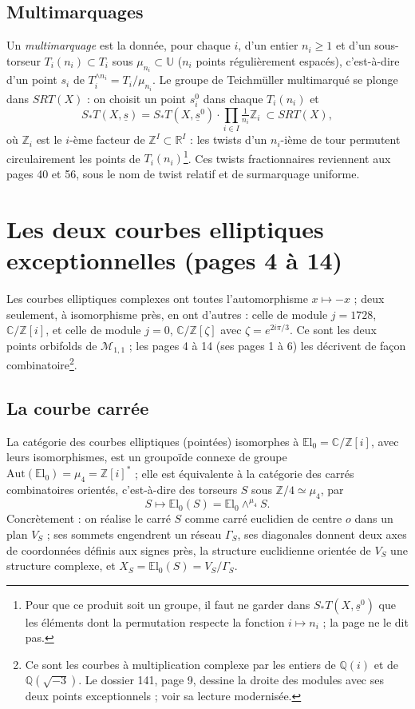 \documentclass[11pt,a4paper]{article}
\begin{document}
\subsection*{Multimarquages}

Un \emph{multimarquage} est la donnée, pour chaque $i$, d'un entier $n_i \geq 1$
et d'un sous-torseur $T_i(n_i) \subset T_i$ sous $\mu_{n_i} \subset \mathbb{U}$
($n_i$ points régulièrement espacés), c'est-à-dire d'un point $s_i$ de
$T_i^{\wedge n_i} = T_i/\mu_{n_i}$. Le groupe de Teichmüller multimarqué se
plonge dans $SRT(X)$ : on choisit un point $s^0_i$ dans chaque $T_i(n_i)$ et
\[
S_{*}T(X, \underline{s}) = S_{*}T(X, \underline{s}^{0}) \cdot \prod_{i \in I}
\tfrac{1}{n_i}\mathbb{Z}_i \ \subset SRT(X),
\]
où $\mathbb{Z}_i$ est le $i$-ème facteur de $\mathbb{Z}^{I} \subset
\mathbb{R}^{I}$ : les twists d'un $n_i$-ième de tour permutent circulairement
les points de $T_i(n_i)$\footnote{Pour que ce produit soit un groupe, il faut ne
garder dans $S_{*}T(X, \underline{s}^{0})$ que les éléments dont la permutation
respecte la fonction $i \mapsto n_i$ ; la page ne le dit pas.}. Ces
twists fractionnaires reviennent aux pages 40 et 56, sous le nom de twist
relatif et de surmarquage uniforme.

\section*{Les deux courbes elliptiques exceptionnelles (pages 4 à 14)}

Les courbes elliptiques complexes ont toutes l'automorphisme $x \mapsto -x$ ;
deux seulement, à isomorphisme près, en ont d'autres : celle de module $j =
1728$, $\mathbb{C}/\mathbb{Z}[i]$, et celle de module $j = 0$,
$\mathbb{C}/\mathbb{Z}[\zeta]$ avec $\zeta = e^{2i\pi/3}$. Ce sont les deux
points orbifolds de $\mathcal{M}_{1,1}$ ; les pages 4 à 14 (ses pages 1 à 6) les
décrivent de façon combinatoire\footnote{Ce sont les courbes à multiplication
complexe par les entiers de $\mathbb{Q}(i)$ et de $\mathbb{Q}(\sqrt{-3})$. Le
dossier 141, page 9, dessine la droite des modules avec ses deux points
exceptionnels ; voir sa lecture modernisée.}.

\subsection*{La courbe carrée}

La catégorie des courbes elliptiques (pointées) isomorphes à
$\mathbb{E}\mathrm{l}_0 = \mathbb{C}/\mathbb{Z}[i]$, avec leurs isomorphismes,
est un groupoïde connexe de groupe $\mathrm{Aut}(\mathbb{E}\mathrm{l}_0) = \mu_4
= \mathbb{Z}[i]^{*}$ ; elle est équivalente à la catégorie des carrés
combinatoires orientés, c'est-à-dire des torseurs $S$ sous $\mathbb{Z}/4 \simeq
\mu_4$, par
\[
S \longmapsto \mathbb{E}\mathrm{l}_0(S) = \mathbb{E}\mathrm{l}_0 \wedge^{\mu_4}
S .
\]
Concrètement : on réalise le carré $S$ comme carré euclidien de centre $o$ dans
un plan $V_S$ ; ses sommets engendrent un réseau $\Gamma_S$, ses diagonales
donnent deux axes de coordonnées définis aux signes près, la structure
euclidienne orientée de $V_S$ une structure complexe, et $X_S =
\mathbb{E}\mathrm{l}_0(S) = V_S/\Gamma_S$.
\end{document}

